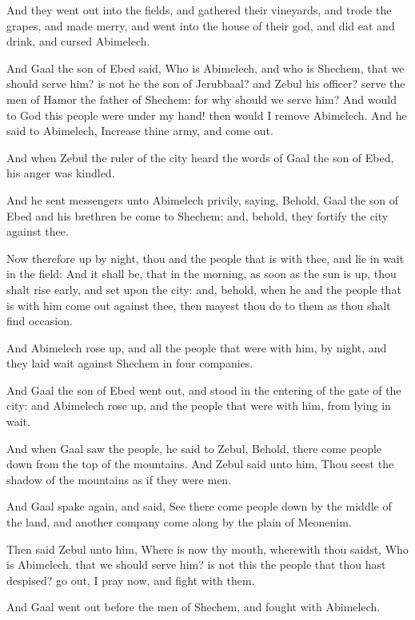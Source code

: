 \verse And they went out into the fields, and gathered their vineyards, and trode the grapes, and made merry, and went into the house of their god, and did eat and drink, and cursed Abimelech.

\verse And Gaal the son of Ebed said, Who is Abimelech, and who is Shechem, that we should serve him? is not he the son of Jerubbaal? and Zebul his officer? serve the men of Hamor the father of Shechem: for why should we serve him?  \verse And would to God this people were under my hand! then would I remove Abimelech. And he said to Abimelech, Increase thine army, and come out.

\verse And when Zebul the ruler of the city heard the words of Gaal the son of Ebed, his anger was kindled.

\verse And he sent messengers unto Abimelech privily, saying, Behold, Gaal the son of Ebed and his brethren be come to Shechem; and, behold, they fortify the city against thee.

\verse Now therefore up by night, thou and the people that is with thee, and lie in wait in the field: \verse And it shall be, that in the morning, as soon as the sun is up, thou shalt rise early, and set upon the city: and, behold, when he and the people that is with him come out against thee, then mayest thou do to them as thou shalt find occasion.

\verse And Abimelech rose up, and all the people that were with him, by night, and they laid wait against Shechem in four companies.

\verse And Gaal the son of Ebed went out, and stood in the entering of the gate of the city: and Abimelech rose up, and the people that were with him, from lying in wait.

\verse And when Gaal saw the people, he said to Zebul, Behold, there come people down from the top of the mountains. And Zebul said unto him, Thou seest the shadow of the mountains as if they were men.

\verse And Gaal spake again, and said, See there come people down by the middle of the land, and another company come along by the plain of Meonenim.

\verse Then said Zebul unto him, Where is now thy mouth, wherewith thou saidst, Who is Abimelech, that we should serve him? is not this the people that thou hast despised? go out, I pray now, and fight with them.

\verse And Gaal went out before the men of Shechem, and fought with Abimelech.

